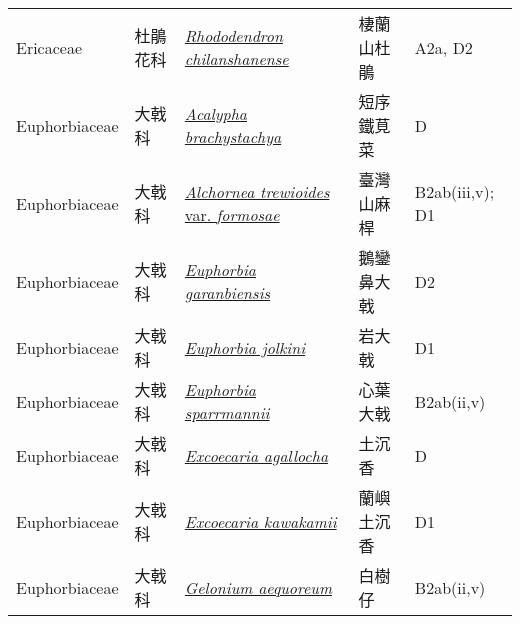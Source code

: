 {\begin{longtable}{L{2.5cm}L{2cm}L{5cm}L{2.5cm}L{3cm}}
    Ericaceae & 杜鵑花科 & \href{http://www.theplantlist.org/tpl1.1/search?q=Rhododendron+chilanshanense}{\textit{Rhododendron chilanshanense} } & 棲蘭山杜鵑 & A2a, D2    \\
    Euphorbiaceae & 大戟科 & \href{http://www.theplantlist.org/tpl1.1/search?q=Acalypha+brachystachya}{\textit{Acalypha brachystachya} } & 短序鐵莧菜 & D    \\
    Euphorbiaceae & 大戟科 & \href{http://www.theplantlist.org/tpl1.1/search?q=Alchornea+trewioides+var.+formosae}{\textit{Alchornea trewioides} var. \textit{formosae} } & 臺灣山麻桿 & B2ab(iii,v); D1    \\
    Euphorbiaceae & 大戟科 & \href{http://www.theplantlist.org/tpl1.1/search?q=Euphorbia+garanbiensis}{\textit{Euphorbia garanbiensis} } & 鵝鑾鼻大戟 & D2    \\
    Euphorbiaceae & 大戟科 & \href{http://www.theplantlist.org/tpl1.1/search?q=Euphorbia+jolkini}{\textit{Euphorbia jolkini} } & 岩大戟 & D1    \\
    Euphorbiaceae & 大戟科 & \href{http://www.theplantlist.org/tpl1.1/search?q=Euphorbia+sparrmannii}{\textit{Euphorbia sparrmannii} } & 心葉大戟 & B2ab(ii,v)    \\
    Euphorbiaceae & 大戟科 & \href{http://www.theplantlist.org/tpl1.1/search?q=Excoecaria+agallocha}{\textit{Excoecaria agallocha} } & 土沉香 & D    \\
    Euphorbiaceae & 大戟科 & \href{http://www.theplantlist.org/tpl1.1/search?q=Excoecaria+kawakamii}{\textit{Excoecaria kawakamii} } & 蘭嶼土沉香 & D1    \\
    Euphorbiaceae & 大戟科 & \href{http://www.theplantlist.org/tpl1.1/search?q=Gelonium+aequoreum}{\textit{Gelonium aequoreum} } & 白樹仔 & B2ab(ii,v)    \\

\end{longtable}}
